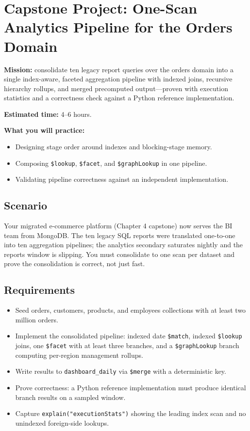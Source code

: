\section{Capstone Project: One-Scan Analytics Pipeline for the Orders Domain}\label{sec:ch10-capstone}

\begin{capstonebox}
\textbf{Mission:} consolidate ten legacy report queries over the orders domain into a single index-aware, faceted aggregation pipeline with indexed joins, recursive hierarchy rollups, and merged precomputed output---proven with execution statistics and a correctness check against a Python reference implementation.

\textbf{Estimated time:} 4--6 hours.

\textbf{What you will practice:}
\begin{itemize}
    \item Designing stage order around indexes and blocking-stage memory.
    \item Composing \texttt{\$lookup}, \texttt{\$facet}, and \texttt{\$graphLookup} in one pipeline.
    \item Validating pipeline correctness against an independent implementation.
\end{itemize}
\end{capstonebox}

\subsection*{Scenario}
Your migrated e-commerce platform (Chapter 4 capstone) now serves the BI team from MongoDB. The ten legacy SQL reports were translated one-to-one into ten aggregation pipelines; the analytics secondary saturates nightly and the reports window is slipping. You must consolidate to one scan per dataset and prove the consolidation is correct, not just fast.

\subsection*{Requirements}
\begin{itemize}
    \item Seed orders, customers, products, and employees collections with at least two million orders.
    \item Implement the consolidated pipeline: indexed date \texttt{\$match}, indexed \texttt{\$lookup} joins, one \texttt{\$facet} with at least three branches, and a \texttt{\$graphLookup} branch computing per-region management rollups.
    \item Write results to \texttt{dashboard\_daily} via \texttt{\$merge} with a deterministic key.
    \item Prove correctness: a Python reference implementation must produce identical branch results on a sampled window.
    \item Capture \texttt{explain("executionStats")} showing the leading index scan and no unindexed foreign-side lookups.
\end{itemize}

